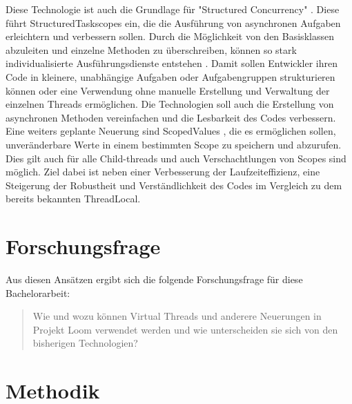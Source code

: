 Diese Technologie ist auch die Grundlage für "Structured Concurrency" \cite{structuredConcurrency}. Diese führt StructuredTaskscopes ein,
die die Ausführung von asynchronen Aufgaben erleichtern und verbessern sollen.
Durch die Möglichkeit von den Basisklassen abzuleiten und einzelne Methoden zu überschreiben, können so stark individualisierte Ausführungsdienste entstehen \cite{AsyncStructuredConcurrency}.
Damit sollen Entwickler ihren Code in kleinere, unabhängige Aufgaben oder Aufgabengruppen strukturieren können oder eine Verwendung ohne manuelle Erstellung
und Verwaltung der einzelnen Threads ermöglichen.
Die Technologien soll auch die Erstellung von asynchronen Methoden vereinfachen und die Lesbarkeit des Codes verbessern.
Eine weiters geplante Neuerung sind ScopedValues \cite{JEP481}, die es ermöglichen sollen, unveränderbare Werte in einem bestimmten Scope zu speichern und abzurufen.
Dies gilt auch für alle Child-threads und auch Verschachtlungen von Scopes sind möglich.
Ziel dabei ist neben einer Verbesserung der Laufzeiteffizienz, eine Steigerung der Robustheit und Verständlichkeit des Codes im Vergleich zu dem bereits bekannten ThreadLocal.







\section{Forschungsfrage}

Aus diesen Ansätzen ergibt sich die folgende Forschungsfrage für diese
Bachelorarbeit:


%

\begin{quote}
	Wie und wozu können Virtual Threads und anderere Neuerungen in Projekt Loom verwendet werden und wie unterscheiden sie sich von den bisherigen Technologien?
\end{quote}


\section{Methodik}

